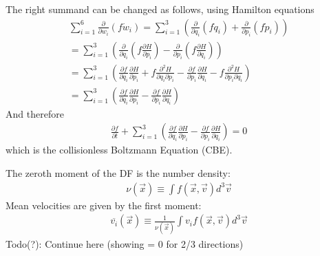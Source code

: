 \documentclass[letterpaper,10pt,english]{sphinxmanual}
\begin{document}
					\sphinxAtStartPar
					The right summand can be changed as follows, using Hamilton equations
					\begin{equation*}
					\begin{split}\sum_{i=1}^{6} \frac{\partial}{\partial w_i}(f\dot{w}_i)
					= \sum_{i=1}^{3} \left ( \frac{\partial}{\partial q_i}\left(f \dot{q}_i\right) + \frac{\partial}{\partial p_i}\left(f\dot{p}_i\right) \right ) \\
					= \sum_{i=1}^{3} \left ( \frac{\partial}{\partial q_i}\left(f \frac{\partial H}{\partial p_i}\right) - \frac{\partial}{\partial p_i}\left(f \frac{\partial H}{\partial q_i} \right) \right) \\
					= \sum_{i=1}^{3} \left (
					\frac{\partial f}{\partial q_i} \frac{\partial H}{\partial p_i}
					+ f  \frac{\partial^2 H}{\partial q_i \partial p_i}
					- \frac{\partial f}{\partial p_i}  \frac{\partial H}{\partial q_i}
					- f \frac{\partial ^2 H}{\partial p_i \partial q_i} \right)  \\
					= \sum_{i=1}^{3} \left (
					\frac{\partial f}{\partial q_i} \frac{\partial H}{\partial p_i}
					- \frac{\partial f}{\partial p_i}  \frac{\partial H}{\partial q_i} \right)\end{split}
					\end{equation*}
					\sphinxAtStartPar
					And therefore
					\begin{equation}\label{equation:NBodySimulation/Initialization:collisionless_boltzmann_equation}
					\begin{split}\frac{\partial f }{\partial t} + \sum_{i=1}^{3} \left (
					 \frac{\partial f}{\partial q_i} \frac{\partial H}{\partial p_i}
					 - \frac{\partial f}{\partial p_i}  \frac{\partial H}{\partial q_i} \right) = 0\end{split}
					\end{equation}
					\sphinxAtStartPar
					which is the collisionless Boltzmann Equation (CBE).
					
					\sphinxAtStartPar
					The zeroth moment of the DF is the number density:
					\begin{equation*}
					\begin{split}\nu(\vec{x}) \equiv \int f(\vec{x},\vec{v})d^3\vec{v}\end{split}
					\end{equation*}
					\sphinxAtStartPar
					Mean velocities are given by the first moment:
					\begin{equation*}
					\begin{split}\overline{v_i}(\vec{x}) \equiv \frac{1}{\nu(\vec{x})}\int v_i f(\vec{x},\vec{v})d^3\vec{v}\end{split}
					\end{equation*}
					\sphinxAtStartPar
					Todo(?): Continue here (showing = 0 for 2/3 directions)
				
\end{document}
